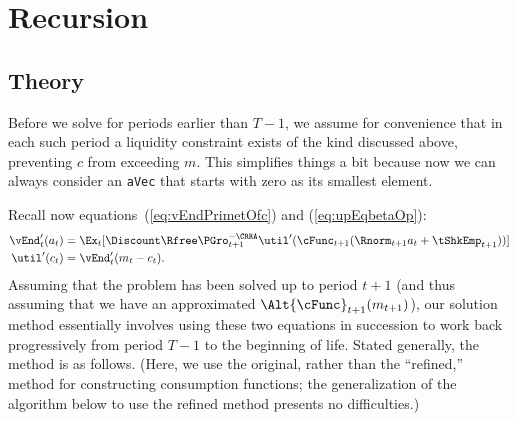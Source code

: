 \documentclass[titlepage]{\econtex}
\begin{document}
\hypertarget{Recursions}{}
\section{Recursion}\label{sec:recursion}
\hypertarget{Theory}{}
\subsection{Theory}
Before we solve for periods earlier than $T-1$, we assume for
convenience that in each such period a liquidity constraint exists of
the kind discussed above, preventing ${c}$ from exceeding ${m}$. This
simplifies things a bit because now we can always consider an
\texttt{aVec} that starts with zero as its smallest element.

Recall now equations~(\ref{eq:vEndPrimetOfc}) and (\ref{eq:upEqbetaOp}):
\begin{equation*}\begin{gathered}\begin{aligned}
  \vEnd_{t}^{\prime}({a}_{t})  & = \Ex_{t}[\Discount \Rfree \PGro_{t+1}^{-\CRRA}
                                    \util^{\prime}(\cFunc_{t+1}(\Rnorm_{t+1} {a}_{t}+{\tShkEmp}_{t+1}))]
  \\\util^{\prime}({c}_{t})   & = \vEnd_{t}^{\prime}({m}_{t}-{c}_{t}).
\end{aligned}\end{gathered}\end{equation*}
Assuming that the problem has been solved up to period $t+1$ (and thus
assuming that we have an approximated $\Alt{\cFunc}_{t+1}({m}_{t+1})$), our solution method essentially
involves using these two equations in succession to work back
progressively from period $T-1$ to the beginning of life.  Stated
generally, the method is as follows.  (Here, we use the original, rather than the ``refined,'' method for 
constructing consumption functions; the generalization of the algorithm below to use the refined method presents
no difficulties.)
\end{document}
